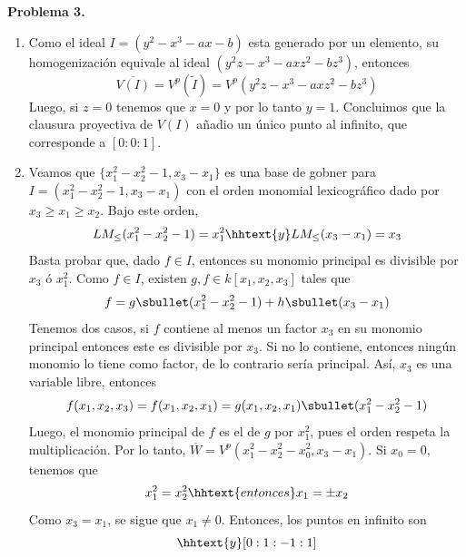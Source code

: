 \documentclass{article}
\begin{document}
\vspace{5mm}
\noindent\textbf{Problema 3.}
\begin{enumerate}
    \item[(a)] Como el ideal $I=(y^{2}-x^{3}-ax-b)$ esta generado por un elemento, su 
    homogenización equivale al ideal $(y^{2}z-x^{3}-axz^{2}-bz^{3})$, entonces
    \begin{equation*}
        \overline{V(I)}=V^{p}(\widetilde{I})=V^{p}(y^{2}z-x^{3}-axz^{2}-bz^{3})
    \end{equation*}
    Luego, si $z=0$ tenemos que $x=0$ y por lo tanto $y=1$. Concluimos que la clausura proyectiva
    de $V(I)$ añadio un único punto al infinito, que corresponde a $[0:0:1]$.
    
    \item[(b)] Veamos que $\{x_{1}^{2}-x_{2}^{2}-1,x_{3}-x_{1}\}$ es una base de gobner para
    $I=(x_{1}^{2}-x_{2}^{2}-1,x_{3}-x_{1})$ con el orden monomial lexicográfico dado por 
    $x_{3}\geq x_{1}\geq x_{2}$. Bajo este orden,
    \begin{equation*}
        LM_{\leq}(x_{1}^{2}-x_{2}^{2}-1)=x_{1}^{2} \hhtext{y}
        LM_{\leq}(x_{3}-x_{1})=x_{3}
    \end{equation*}
    Basta probar que, dado $f\in I$, entonces su monomio principal es divisible por $x_{3}$ ó 
    $x_{1}^{2}$. Como $f\in I$, existen $g,f\in k[x_{1},x_{2},x_{3}]$ tales que
    \begin{equation*}
        f=g\sbullet(x_{1}^{2}-x_{2}^{2}-1)+h\sbullet(x_{3}-x_{1})
    \end{equation*}
    Tenemos dos casos, si $f$ contiene al menos un factor $x_{3}$ en su monomio principal entonces
    este es divisible por $x_{3}$. Si no lo contiene, entonces ningún monomio lo tiene como
    factor, de lo contrario sería principal. Así, $x_{3}$ es una variable libre, entonces
    \begin{equation*}
        f(x_{1},x_{2},x_{3})
        =f(x_{1},x_{2},x_{1})=g(x_{1},x_{2},x_{1})\sbullet(x_{1}^{2}-x_{2}^{2}-1)
    \end{equation*}
    Luego, el monomio principal de $f$ es el de $g$ por $x_{1}^{2}$, pues el orden respeta la 
    multiplicación. Por lo tanto, $\overline{W}=V^{p}(x_{1}^{2}-x_{2}^{2}-x_{0}^{2},x_{3}-x_{1})$.
    Si $x_{0}=0$, tenemos que
    \begin{equation*}
        x_{1}^{2}=x_{2}^{2} \hhtext{entonces} x_{1}=\pm x_{2}
    \end{equation*}
    Como $x_{3}=x_{1}$, se sigue que $x_{1}\neq0$. Entonces, los puntos en infinito son
    \begin{equation*}
        [0:1:1:1] \hhtext{y} [0:1:-1:1]
    \end{equation*}
\end{enumerate}
\end{document}
